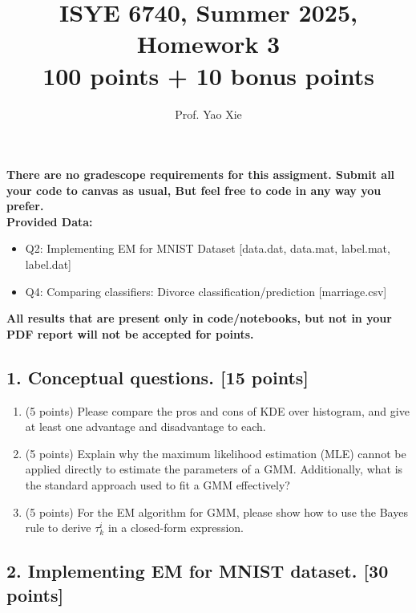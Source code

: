 \documentclass[12pt]{article}
\begin{document}
\title{ISYE 6740, Summer 2025, Homework 3\\{\small 100 points + 10 bonus points}}
\author{Prof. Yao Xie}
\date{}
\maketitle

\textbf{There are no gradescope requirements for this assigment. Submit all your code to canvas as usual, But feel free to code in any way you prefer.}\\
\textbf{Provided Data:}
\begin{itemize}
    \item Q2: Implementing EM for MNIST Dataset [data.dat, data.mat, label.mat, label.dat]
    \item Q4: Comparing classifiers: Divorce classification/prediction [marriage.csv]
    
\end{itemize}

\leavevmode\newline
\textbf{All results that are present only in code/notebooks, but not in your PDF report will not be accepted for points.}\\
\subsection*{1. Conceptual questions. [15 points]}


\begin{enumerate}[label*=\arabic*.]



\item (5 points) Please compare the pros and cons of KDE over histogram, and give at least one advantage and disadvantage to each.

\item (5 points) Explain why the maximum likelihood estimation (MLE) cannot be applied directly to estimate the parameters of a GMM. Additionally, what is the standard approach used to fit a GMM effectively?

\item (5 points) For the EM algorithm for GMM, please show how to use the Bayes rule to derive $\tau_k^i$ in a closed-form expression. 

\end{enumerate}


\subsection*{2. Implementing EM for MNIST dataset. [30 points]}
\end{document}
